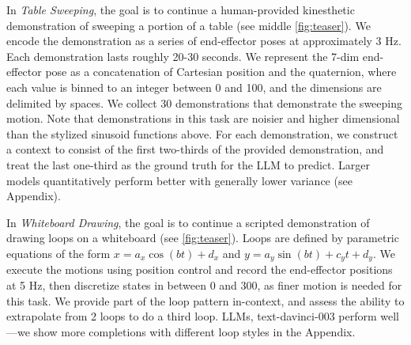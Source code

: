 In \textit{Table Sweeping}, the goal is to continue a human-provided kinesthetic demonstration of sweeping a portion of a table (see middle \cref{fig:teaser}). We encode the demonstration as a series of end-effector poses at approximately 3 Hz. Each demonstration lasts roughly 20-30 seconds. We represent the 7-dim end-effector pose as a concatenation of Cartesian position and the quaternion, where each value is binned to an integer between 0 and 100, and the dimensions are delimited by spaces. We collect 30 demonstrations that demonstrate the sweeping motion. Note that demonstrations in this task are noisier and higher dimensional than the stylized sinusoid functions above. For each demonstration, we construct a context to consist of the first two-thirds of the provided demonstration, and treat the last one-third as the ground truth for the LLM to predict. Larger models quantitatively perform better with generally lower variance (see Appendix).

In \textit{Whiteboard Drawing}, the goal is to continue a scripted demonstration of drawing loops on a whiteboard (see \cref{fig:teaser}). Loops are defined by parametric equations of the form $x = a_x \cos(bt) + d_x$ and $y = a_y \sin(bt) + c_y t + d_y$. We execute the motions using position control and record the end-effector positions at 5 Hz, then discretize states in between 0 and 300, as finer motion is needed for this task. We provide part of the loop pattern in-context, and assess the ability to extrapolate from 2 loops to do a third loop. LLMs, \eg text-davinci-003 perform well---we show more completions with different loop styles in the Appendix.